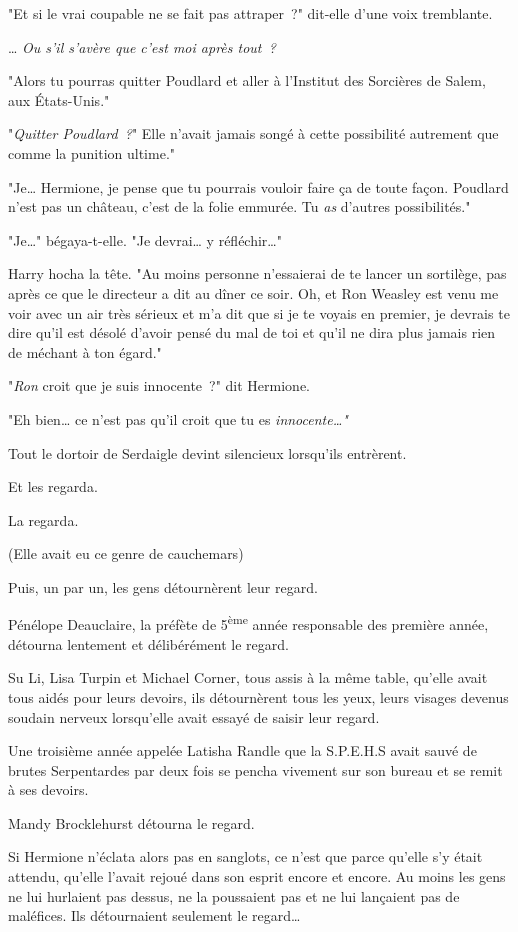 "Et si le vrai coupable ne se fait pas attraper~?" dit-elle d'une voix tremblante.

… \emph{Ou s'il s'avère que c'est moi après tout~?}

"Alors tu pourras quitter Poudlard et aller à l'Institut des Sorcières de Salem, aux États-Unis."

"\emph{Quitter Poudlard~?}" Elle n'avait jamais songé à cette possibilité autrement que comme la punition ultime."

"Je… Hermione, je pense que tu pourrais vouloir faire ça de toute façon. Poudlard n'est pas un château, c'est de la folie emmurée. Tu \emph{as} d'autres possibilités."

"Je…" bégaya-t-elle. "Je devrai… y réfléchir…"

Harry hocha la tête. "Au moins personne n'essaierai de te lancer un sortilège, pas après ce que le directeur a dit au dîner ce soir. Oh, et Ron Weasley est venu me voir avec un air très sérieux et m'a dit que si je te voyais en premier, je devrais te dire qu'il est désolé d'avoir pensé du mal de toi et qu'il ne dira plus jamais rien de méchant à ton égard."

"\emph{Ron} croit que je suis innocente~?" dit Hermione.

"Eh bien… ce n'est pas qu'il croit que tu es \emph{innocente…"}

\later

Tout le dortoir de Serdaigle devint silencieux lorsqu'ils entrèrent.

Et les regarda.

La regarda.

(Elle avait eu ce genre de cauchemars)

Puis, un par un, les gens détournèrent leur regard.

Pénélope Deauclaire, la préfète de 5\textsuperscript{ème} année responsable des première année, détourna lentement et délibérément le regard.

Su Li, Lisa Turpin et Michael Corner, tous assis à la même table, qu'elle avait tous aidés pour leurs devoirs, ils détournèrent tous les yeux, leurs visages devenus soudain nerveux lorsqu'elle avait essayé de saisir leur regard.

Une troisième année appelée Latisha Randle que la S.P.E.H.S avait sauvé de brutes Serpentardes par deux fois se pencha vivement sur son bureau et se remit à ses devoirs.

Mandy Brocklehurst détourna le regard.

Si Hermione n'éclata alors pas en sanglots, ce n'est que parce qu'elle s'y était attendu, qu'elle l'avait rejoué dans son esprit encore et encore. Au moins les gens ne lui hurlaient pas dessus, ne la poussaient pas et ne lui lançaient pas de maléfices. Ils détournaient seulement le regard…


